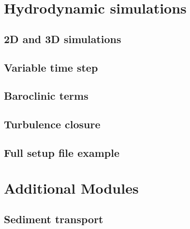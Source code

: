 \documentclass{report}
\begin{document}
\chapter{Hydrodynamic simulations}

	\section{2D and 3D simulations}
	

	\section{Variable time step}
	


	\section{Baroclinic terms}
	

	\section{Turbulence closure}
	

	\section{Full setup file example}
	


\chapter{Additional Modules}

	\section{Sediment transport}
	
\end{document}

